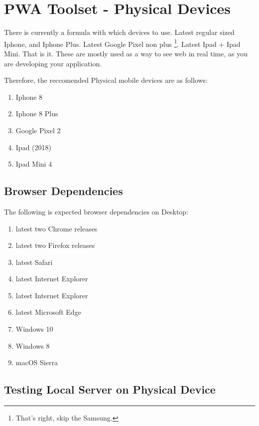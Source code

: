 \maketitle{}
\section{ PWA Toolset - Physical Devices }

There is currently a formula with which devices to use. Latest regular sized
Iphone, and Iphone Plus. Latest Google Pixel non plus
\footnote{That's right, skip the Samsung.}. Latest Ipad + Ipad Mini. That
is it. These are mostly used as a way to see web in real time, as you are
developing your application.

Therefore, the reccomended Physical mobile devices are as follows:
\begin{enumerate}
  \item Iphone 8
  \item Iphone 8 Plus
  \item Google Pixel 2
  \item Ipad (2018)
  \item Ipad Mini 4
\end{enumerate}

\subsection{ Browser Dependencies }

The following is expected browser dependencies on Desktop:
\begin{enumerate}
  \item latest two Chrome releases
  \item latest two Firefox releases
  \item latest Safari
  \item latest Internet Explorer
  \item latest Internet Explorer
  \item latest Microsoft Edge
  \item Windows 10
  \item Windows 8
  \item macOS Sierra
\end{enumerate}

\subsection{ Testing Local Server on Physical Device }

